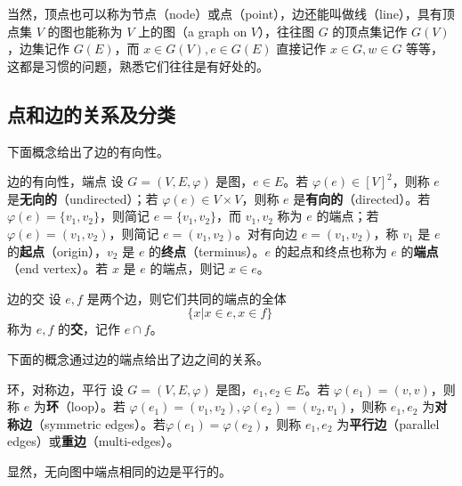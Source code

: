 当然，顶点也可以称为节点（node）或点（point），边还能叫做线（line），具有顶点集 $V$ 的图也能称为 $V$ 上的图（a graph on $V$），往往图 $G$ 的顶点集记作 $G(V)$，边集记作 $G(E)$，而 $x\in G(V),e\in G(E)$ 直接记作 $x\in G,w\in G$ 等等，这都是习惯的问题，熟悉它们往往是有好处的。

\subsection{点和边的关系及分类}


下面概念给出了边的有向性。
\begin{definition}{边的有向性，端点}
设 $G=(V,E,\varphi)$ 是图，$e\in E$。若 $\varphi(e)\in[V]^2$，则称 $e$ 是\textbf{无向的}（undirected）；若 $\varphi(e)\in V\times V$，则称 $e$ 是\textbf{有向的}（directed）。若 $\varphi(e)=\{v_1,v_2\}$，则简记 $e=\{v_1,v_2\}$，而 $v_1,v_2$ 称为 $e$ 的端点；若 $\varphi(e)=(v_1,v_2)$，则简记 $e=(v_1,v_2)$。对有向边 $e=(v_1,v_2)$，称 $v_1$ 是 $e$ 的\textbf{起点}（origin），$v_2$ 是 $e$ 的\textbf{终点}（terminus）。$e$ 的起点和终点也称为 $e$ 的\textbf{端点}（end vertex）。若 $x$ 是 $e$ 的端点，则记 $x\in e$。
\end{definition}

\begin{definition}{边的交}
设 $e,f$ 是两个边，则它们共同的端点的全体
\begin{equation}
\{x|x\in e,x\in f\}~
\end{equation}
称为 $e,f$ 的\textbf{交}，记作 $e\cap f$。
\end{definition}

下面的概念通过边的端点给出了边之间的关系。
\begin{definition}{环，对称边，平行}
设 $G=(V,E,\varphi)$ 是图，$e_1,e_2\in E$。若 $\varphi(e_1)=(v,v)$，则称 $e$ 为\textbf{环}（loop）。若 $\varphi(e_1)=(v_1,v_2),\varphi(e_2)=(v_2,v_1)$，则称 $e_1,e_2$ 为\textbf{对称边}（symmetric edges）。若$\varphi(e_1)=\varphi(e_2)$，则称 $e_1,e_2$ 为\textbf{平行边}（parallel edges）或\textbf{重边}（multi-edges）。
\end{definition}
显然，无向图中端点相同的边是平行的。

